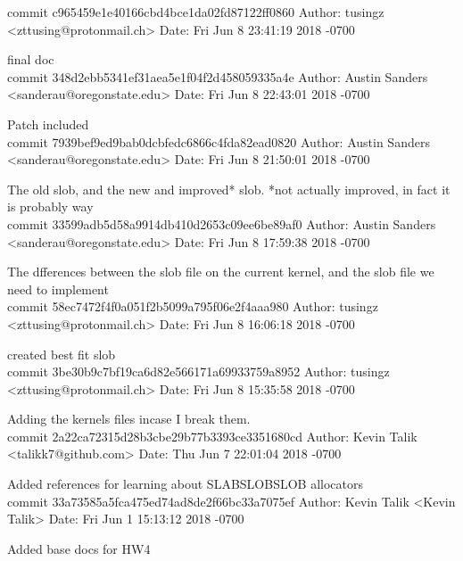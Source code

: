 \documentclass[onecolumn, draftclsnofoot,10pt, compsoc]{IEEEtran}
\begin{document}
        {\obeylines %
       commit c965459e1e40166cbd4bce1da02fd87122ff0860
Author: tusingz <zttusing@protonmail.ch>
Date:   Fri Jun 8 23:41:19 2018 -0700

    final doc\\

commit 348d2ebb5341ef31aea5e1f04f2d458059335a4e
Author: Austin Sanders <sanderau@oregonstate.edu>
Date:   Fri Jun 8 22:43:01 2018 -0700

    Patch included\\

commit 7939bef9ed9bab0dcbfedc6866c4fda82ead0820
Author: Austin Sanders <sanderau@oregonstate.edu>
Date:   Fri Jun 8 21:50:01 2018 -0700

    The old slob, and the new and improved* slob. *not actually improved, in fact it is probably way \\

commit 33599adb5d58a9914db410d2653c09ee6be89af0
Author: Austin Sanders <sanderau@oregonstate.edu>
Date:   Fri Jun 8 17:59:38 2018 -0700

    The dfferences between the slob file on the current kernel, and the slob file we need to implement\\

commit 58ec7472f4f0a051f2b5099a795f06e2f4aaa980
Author: tusingz <zttusing@protonmail.ch>
Date:   Fri Jun 8 16:06:18 2018 -0700

    created best fit slob\\

commit 3be30b9c7bf19ca6d82e566171a69933759a8952
Author: tusingz <zttusing@protonmail.ch>
Date:   Fri Jun 8 15:35:58 2018 -0700

    Adding the kernels files incase I break them.\\

commit 2a22ca72315d28b3cbe29b77b3393ce3351680cd
Author: Kevin Talik <talikk7@github.com>
Date:   Thu Jun 7 22:01:04 2018 -0700

    Added references for learning about SLABSLOBSLOB allocators\\

commit 33a73585a5fca475ed74ad8de2f66bc33a7075ef
Author: Kevin Talik <Kevin Talik>
Date:   Fri Jun 1 15:13:12 2018 -0700

    Added base docs for HW4\\
}
        
 
              
        
        

        
\end{document}
